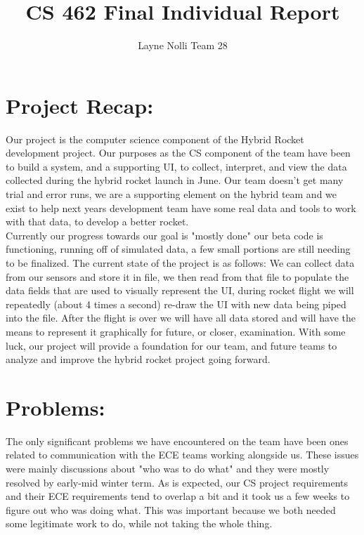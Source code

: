 \documentclass{article}
\title{CS 462 Final Individual Report}
\author{Layne Nolli Team 28}
\begin{document}
\maketitle

\section{Project Recap:}

Our project is the computer science component of the Hybrid Rocket development project. Our purposes as the CS component of the team have been to build a system, and a supporting UI, to collect, interpret, and view the data collected during the hybrid rocket launch in June. Our team doesn't get many trial and error runs, we are a supporting element on the hybrid team and we exist to help next years development team have some real data and tools to work with that data, to develop a better rocket.\\

Currently our progress towards our goal is "mostly done" our beta code is functioning, running off of simulated data, a few small portions are still needing to be finalized. The current state of the project is as follows: We can collect data from our sensors and store it in file, we then read from that file to populate the data fields that are used to visually represent the UI, during rocket flight we will repeatedly (about 4 times a second) re-draw the UI with new data being piped into the file. After the flight is over we will have all data stored and will have the means to represent it graphically for future, or closer, examination. With some luck, our project will provide a foundation for our team, and future teams to analyze and improve the hybrid rocket project going forward.\\

\section{Problems:}

The only significant problems we have encountered on the team have been ones related to communication with the ECE teams working alongside us. These issues were mainly discussions about "who was to do what" and they were mostly resolved by early-mid winter term. As is expected, our CS project requirements and their ECE requirements tend to overlap a bit and it took us a few weeks to figure out who was doing what. This was important because we both needed some legitimate work to do, while not taking the whole thing.\\
\end{document}
